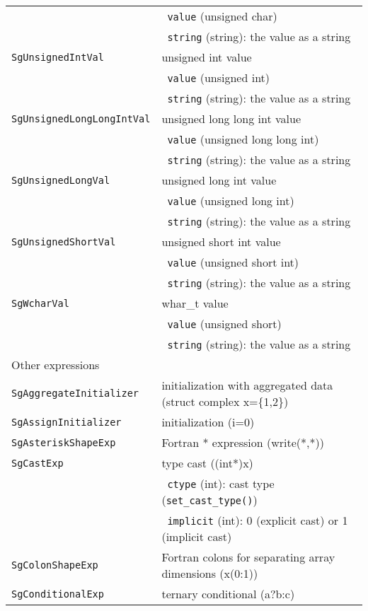 \begin{longtable}[l]{l|p{10cm}}
 & ~\texttt{value} (unsigned char) \\
 & ~\texttt{string} (string): the value as a string \\
 \texttt{SgUnsignedIntVal}& unsigned int value\\
 & ~\texttt{value} (unsigned int) \\
 & ~\texttt{string} (string): the value as a string \\
 \texttt{SgUnsignedLongLongIntVal}& unsigned long long int value\\
 & ~\texttt{value} (unsigned long long int) \\
 & ~\texttt{string} (string): the value as a string \\
 \texttt{SgUnsignedLongVal}& unsigned long int value\\
 & ~\texttt{value} (unsigned long int) \\
 & ~\texttt{string} (string): the value as a string \\
 \texttt{SgUnsignedShortVal}& unsigned short int value\\
 & ~\texttt{value} (unsigned short int) \\
 & ~\texttt{string} (string): the value as a string \\
 \texttt{SgWcharVal}& whar\_t value\\
 & ~\texttt{value} (unsigned short) \\
 & ~\texttt{string} (string): the value as a string \\
 \hline
 \multicolumn{2}{l}{Other expressions}\\
 \hline
 \texttt{SgAggregateInitializer} & initialization with aggregated data (struct complex x=\{1,2\}) \\
 \texttt{SgAssignInitializer} & initialization (i=0)\\
 \texttt{SgAsteriskShapeExp} & Fortran * expression (write(*,*))\\
 \texttt{SgCastExp} & type cast ((int*)x)\\
 & ~\texttt{ctype} (int): cast type (\texttt{set\_cast\_type()}) \\
 & ~\texttt{implicit} (int): 0 (explicit cast) or 1 (implicit cast)\\
 \texttt{SgColonShapeExp} & Fortran colons for separating array dimensions (x(0:1))\\
 \texttt{SgConditionalExp} & ternary conditional (a?b:c)\\

\end{longtable}
